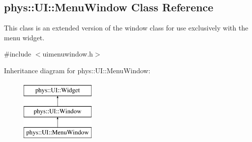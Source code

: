 \hypertarget{classphys_1_1UI_1_1MenuWindow}{
\subsection{phys::UI::MenuWindow Class Reference}
\label{classphys_1_1UI_1_1MenuWindow}
}


This class is an extended version of the window class for use exclusively with the menu widget.  




{\ttfamily \#include $<$uimenuwindow.h$>$}

Inheritance diagram for phys::UI::MenuWindow:\begin{figure}[H]
\begin{center}
\leavevmode
\includegraphics[height=3.000000cm]{classphys_1_1UI_1_1MenuWindow}
\end{center}
\end{figure}
